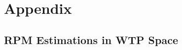\documentclass[12pt]{article}
\begin{document}
\section*{Appendix}

\subsection*{RPM Estimations in WTP Space}



 

% 






\newpage

\end{document}

